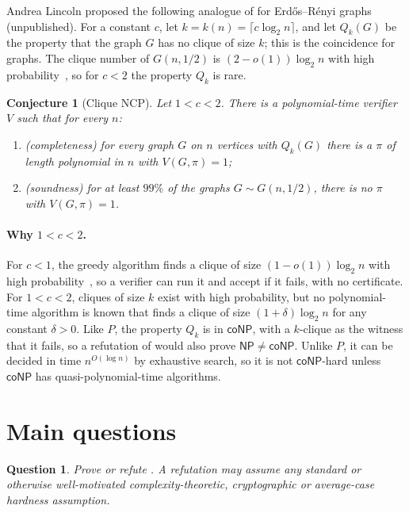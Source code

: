 \documentclass[11pt]{article}
\newtheorem{conjecture}{Conjecture}
\newtheorem{question}{Question}
\theoremstyle{remark}
\newcommand{\NP}{\mathsf{NP}}
\newcommand{\coNP}{\mathsf{coNP}}
\begin{document}
Andrea Lincoln proposed the following analogue of  for Erd\H{o}s--R\'enyi graphs (unpublished).
For a constant $c$, let $k = k(n) = \lceil c \log_2 n \rceil$, and let $Q_k(G)$ be the property that the graph $G$ has no clique of size $k$; this is the coincidence for graphs. The clique number of $G(n, 1/2)$ is $(2 - o(1)) \log_2 n$ with high probability~\cite{matula1976,bollobas-erdos1976}, so for $c < 2$ the property $Q_k$ is rare.

\begin{conjecture}[Clique NCP]\label{conj:clique}
Let $1 < c < 2$. There is a polynomial-time verifier $V$ such that for every $n$:
\begin{enumerate}
\item (completeness) for every graph $G$ on $n$ vertices with $Q_k(G)$ there is a $\pi$ of length polynomial in $n$ with $V(G, \pi) = 1$;
\item (soundness) for at least $99\%$ of the graphs $G \sim G(n, 1/2)$, there is no $\pi$ with $V(G, \pi) = 1$.
\end{enumerate}
\end{conjecture}

\paragraph{Why $1 < c < 2$.} For $c < 1$, the greedy algorithm finds a clique of size $(1 - o(1)) \log_2 n$ with high probability~\cite{grimmett-mcdiarmid}, so a verifier can run it and accept if it fails, with no certificate. For $1 < c < 2$, cliques of size $k$ exist with high probability, but no polynomial-time algorithm is known that finds a clique of size $(1 + \delta) \log_2 n$ for any constant $\delta > 0$. Like $P$, the property $Q_k$ is in $\coNP$, with a $k$-clique as the witness that it fails, so a refutation of  would also prove $\NP \neq \coNP$. Unlike $P$, it can be decided in time $n^{O(\log n)}$ by exhaustive search, so it is not $\coNP$-hard unless $\coNP$ has quasi-polynomial-time algorithms.

\section*{Main questions}

\begin{question}\label{q:ncp}
Prove or refute . A refutation may assume any standard or otherwise well-motivated complexity-theoretic, cryptographic or average-case hardness assumption.
\end{question}
\end{document}
